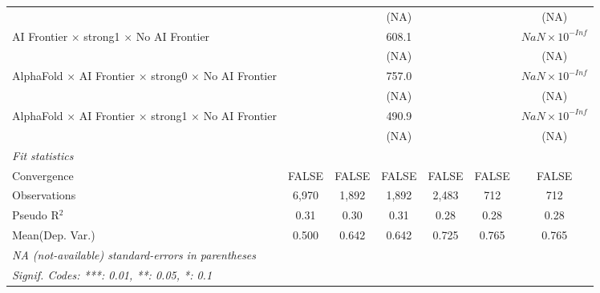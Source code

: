 \begin{tabular}{lcccccc}
                                                                              &                        &        & (NA)   &                        &                        & (NA)\\   
   AI Frontier $\times$ strong1 $\times$ No AI Frontier                       &                        &        & 608.1  &                        &                        & $NaN\times 10^{-Inf}$\\    
                                                                              &                        &        & (NA)   &                        &                        & (NA)\\   
   AlphaFold $\times$ AI Frontier $\times$ strong0 $\times$ No AI Frontier    &                        &        & 757.0  &                        &                        & $NaN\times 10^{-Inf}$\\    
                                                                              &                        &        & (NA)   &                        &                        & (NA)\\   
   AlphaFold $\times$ AI Frontier $\times$ strong1 $\times$ No AI Frontier    &                        &        & 490.9  &                        &                        & $NaN\times 10^{-Inf}$\\    
                                                                              &                        &        & (NA)   &                        &                        & (NA)\\   
   \midrule
   \emph{Fit statistics}\\
   Convergence                                                                &FALSE                   & FALSE  & FALSE  & FALSE                  & FALSE                  & FALSE\\  
   Observations                                                               & 6,970                  & 1,892  & 1,892  & 2,483                  & 712                    & 712\\  
   Pseudo R$^2$                                                               & 0.31                   & 0.30   & 0.31   & 0.28                   & 0.28                   & 0.28\\  
Mean(Dep. Var.) & 0.500 & 0.642 & 0.642 & 0.725 & 0.765 & 0.765 \\
   \midrule \midrule
   \multicolumn{7}{l}{\emph{NA (not-available) standard-errors in parentheses}}\\
   \multicolumn{7}{l}{\emph{Signif. Codes: ***: 0.01, **: 0.05, *: 0.1}}\\
\end{tabular}
\par\endgroup

